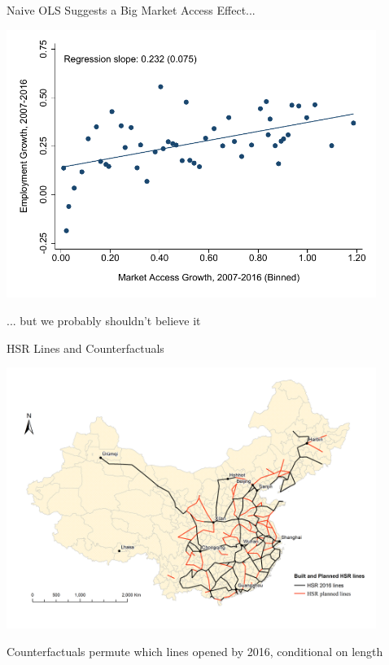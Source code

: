 \documentclass[11pt,english]{beamer}
\begin{document}
\begin{frame}{Naive OLS Suggests a Big Market Access Effect...}
\begin{center}
	\includegraphics[width=0.9\textwidth]{figures/emp_ols_binscatter.pdf}
\end{center}
\vspace{-0.3cm}
... but we probably shouldn't believe it
\end{frame}

\begin{frame}{HSR Lines and Counterfactuals}

\begin{center}
	\includegraphics[width=0.9\textwidth]{figures/Lines_actual_planned.png}
\end{center}

Counterfactuals permute which lines opened by 2016, conditional on length

\end{frame}
\end{document}
